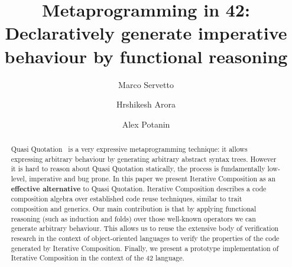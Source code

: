 \documentclass[runningheads]{llncs}
\begin{document}
%
\title{Metaprogramming in 42:
Declaratively generate imperative behaviour by functional reasoning}
%
%
\author{Marco Servetto %
\and
Hrshikesh Arora %
\and
Alex Potanin %
}
%
%
%
\maketitle              %
%
\begin{abstract}
Quasi Quotation~\cite{moggi1999idealized,pitman1980special,sheard2002template} is a very expressive metaprogramming technique: it allows expressing arbitrary behaviour by
generating arbitrary abstract syntax trees.
However it is hard to reason about Quasi Quotation statically,
the process is fundamentally low-level, imperative and bug prone.
In this paper we present Iterative Composition as
an \textbf{effective alternative} to Quasi Quotation.
Iterative Composition describes a code composition algebra over established code reuse techniques,
similar to trait composition and generics.
Our main contribution is that by applying functional reasoning (such as induction and folds)
over those well-known operators we can generate arbitrary behaviour.
This allows us to reuse the extensive body of verification research in the 
context of object-oriented languages to verify the properties
of the code generated by Iterative Composition.
Finally, we present a prototype implementation of Iterative Composition in the context of the 42 language.


%
%
%


\end{abstract}
\end{document}
